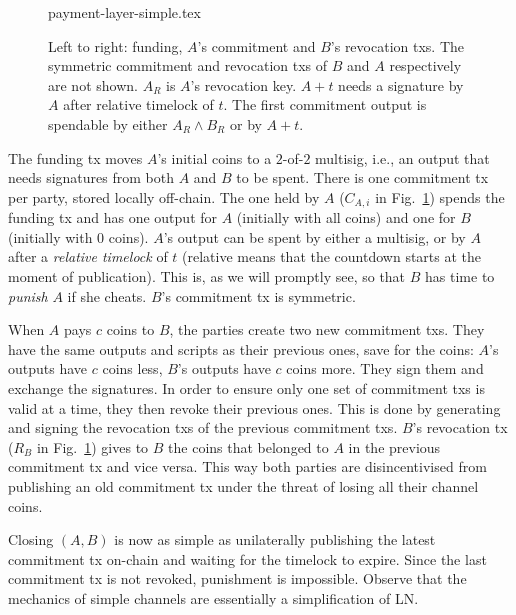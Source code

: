   \begin{figure}[!htbp]
    \centering
    {payment-layer-simple.tex}
    \caption{Left to right: funding, $A$'s commitment and $B$'s revocation txs.
    The symmetric commitment and
    revocation txs of $B$ and $A$ respectively are not shown.
    $A_R$ is $A$'s revocation key. $A+t$ needs a signature
    by $A$ after relative timelock of $t$. The first commitment output is
    spendable by either $A_R \wedge B_R$ or by $A + t$.}%
    \label{figure:payment-layer-simple}
  \end{figure}

  The funding tx moves $A$'s initial coins to a $2$-of-$2$ multisig, i.e., an
  output that needs signatures from both $A$ and $B$ to be spent. There is one
  commitment tx per party, stored locally off-chain. The one held by $A$
  ($C_{A,i}$ in Fig.~\ref{figure:payment-layer-simple}) spends the funding tx
  and has one output for $A$ (initially with all coins) and one for $B$
  (initially with $0$ coins). $A$'s output can be spent by either a multisig, or
  by $A$ after a \emph{relative timelock} of $t$ (relative means that the countdown starts at the moment of
  publication). This is, as we will promptly see, so
  that $B$ has time to \emph{punish} $A$ if she cheats. $B$'s commitment tx
  is symmetric.

  When $A$ pays $c$ coins to $B$, the parties create two new commitment txs.
  They have the same outputs and scripts as their previous ones, save for the
  coins: $A$'s outputs have $c$ coins less, $B$'s outputs have $c$ coins more.
  They sign them and exchange the signatures. In order to ensure only one set of
  commitment txs is valid at a time, they then revoke their previous ones. This
  is done by generating and signing the revocation txs of the previous
  commitment txs. $B$'s revocation tx ($R_B$ in
  Fig.~\ref{figure:payment-layer-simple}) gives to $B$ the coins that belonged
  to $A$ in the previous commitment tx and vice versa. This way both parties are
  disincentivised from publishing an old commitment tx under the threat of
  losing all their channel coins.

  Closing $(A, B)$ is now as simple as unilaterally publishing the latest
  commitment tx on-chain and waiting for the timelock to expire. Since the last
  commitment tx is not revoked, punishment is impossible. Observe that the
  mechanics of simple channels are essentially a simplification of LN.


